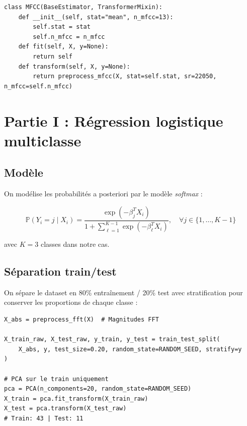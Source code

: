 \documentclass{name}
\begin{document}
\begin{lstlisting}[caption={Classe MFCC compatible scikit-learn}]
class MFCC(BaseEstimator, TransformerMixin):
    def __init__(self, stat="mean", n_mfcc=13):
        self.stat = stat
        self.n_mfcc = n_mfcc
    def fit(self, X, y=None):
        return self
    def transform(self, X, y=None):
        return preprocess_mfcc(X, stat=self.stat, sr=22050, n_mfcc=self.n_mfcc)
\end{lstlisting}


\newpage
\section{Partie I : Régression logistique multiclasse}

\subsection{Modèle}

On modélise les probabilités a posteriori par le modèle \textit{softmax} :

$$
\mathbb{P}(Y_i = j \mid X_i) = \frac{\exp(-\beta_j^T X_i)}{1 + \sum_{\ell=1}^{K-1} \exp(-\beta_\ell^T X_i)}, \quad \forall j \in \{1, \dots, K-1\}
$$

avec $K=3$ classes dans notre cas.

\subsection{Séparation train/test}

On sépare le dataset en 80\% entraînement / 20\% test avec stratification pour conserver les proportions de chaque classe :

\begin{lstlisting}[caption={Split stratifié 80/20}]
X_abs = preprocess_fft(X)  # Magnitudes FFT

X_train_raw, X_test_raw, y_train, y_test = train_test_split(
    X_abs, y, test_size=0.20, random_state=RANDOM_SEED, stratify=y
)

# PCA sur le train uniquement
pca = PCA(n_components=20, random_state=RANDOM_SEED)
X_train = pca.fit_transform(X_train_raw)
X_test = pca.transform(X_test_raw)
# Train: 43 | Test: 11
\end{lstlisting}
\end{document}
